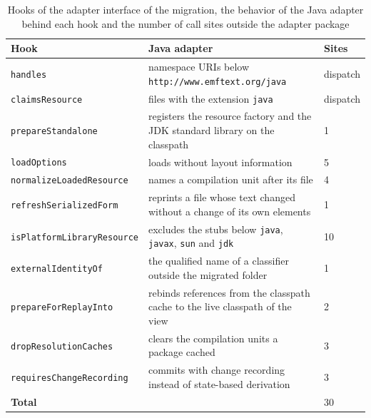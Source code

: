 \begin{table}[htbp]
    \centering
    \begin{tabular}{|l|p{6.6cm}|l|}
        \hline
        \textbf{Hook}                      & \textbf{Java adapter}                                                                 & \textbf{Sites} \\
        \hline
        \texttt{handles}                   & namespace URIs below \texttt{http://www.emftext.org/java}                             & dispatch       \\
        \hline
        \texttt{claimsResource}            & files with the extension \texttt{java}                                                & dispatch       \\
        \hline
        \texttt{prepareStandalone}         & registers the resource factory and the JDK standard library on the classpath          & 1              \\
        \hline
        \texttt{loadOptions}               & loads without layout information                                                      & 5              \\
        \hline
        \texttt{normalizeLoadedResource}   & names a compilation unit after its file                                               & 4              \\
        \hline
        \texttt{refreshSerializedForm}     & reprints a file whose text changed without a change of its own elements               & 1              \\
        \hline
        \texttt{isPlatformLibraryResource} & excludes the stubs below \texttt{java}, \texttt{javax}, \texttt{sun} and \texttt{jdk} & 10             \\
        \hline
        \texttt{externalIdentityOf}        & the qualified name of a classifier outside the migrated folder                        & 1              \\
        \hline
        \texttt{prepareForReplayInto}      & rebinds references from the classpath cache to the live classpath of the view         & 2              \\
        \hline
        \texttt{dropResolutionCaches}      & clears the compilation units a package cached                                         & 3              \\
        \hline
        \texttt{requiresChangeRecording}   & commits with change recording instead of state-based derivation                       & 3              \\
        \hline
        \textbf{Total}                     &                                                                                       & 30             \\
        \hline
    \end{tabular}
    \caption{Hooks of the adapter interface of the migration, the behavior of the Java adapter behind each hook and the number of call sites outside the adapter package}
    \label{table:adapter-hooks}
\end{table}

